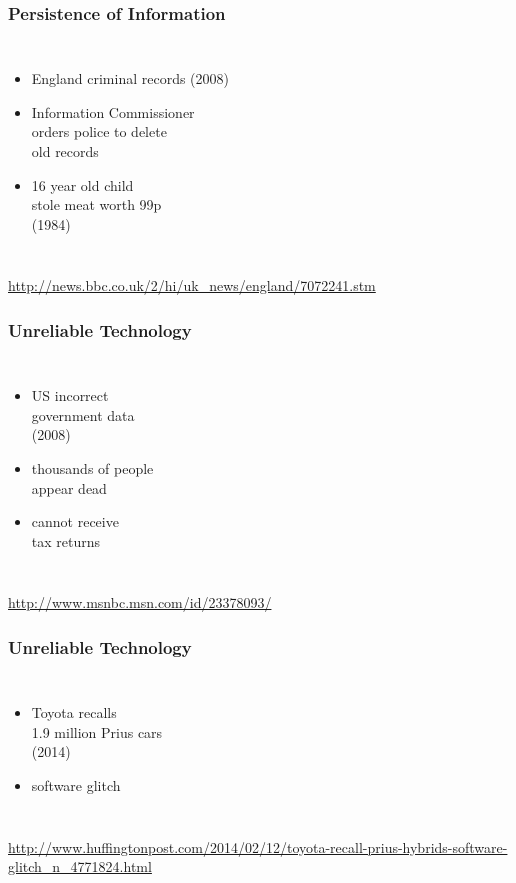 \documentclass[dvipsnames]{beamer}
\begin{document}
\begin{frame}
  \frametitle{Persistence of Information}

  \begin{columns}

    \begin{itemize}
      \item England criminal records (2008)
      \item Information Commissioner\\
        orders police to delete\\
        old records
      \item 16 year old child\\
        stole meat worth 99p\\
        (1984)
    \end{itemize}
  \end{columns}

  \medskip
  \tiny{\url{http://news.bbc.co.uk/2/hi/uk_news/england/7072241.stm}}
\end{frame}

\begin{frame}
  \frametitle{Unreliable Technology}

  \begin{columns}

    \begin{itemize}
      \item US incorrect\\
        government data\\
        (2008)
      \item thousands of people\\
        appear dead
      \item cannot receive\\
        tax returns
    \end{itemize}
  \end{columns}

  \medskip
  \tiny{\url{http://www.msnbc.msn.com/id/23378093/}}
\end{frame}

\begin{frame}
  \frametitle{Unreliable Technology}

  \begin{columns}

    \begin{itemize}
      \item Toyota recalls\\
        1.9 million Prius cars\\
        (2014)
      \item software glitch
    \end{itemize}
  \end{columns}

  \medskip
  \tiny{\url{http://www.huffingtonpost.com/2014/02/12/toyota-recall-prius-hybrids-software-glitch_n_4771824.html}}
\end{frame}
\end{document}
